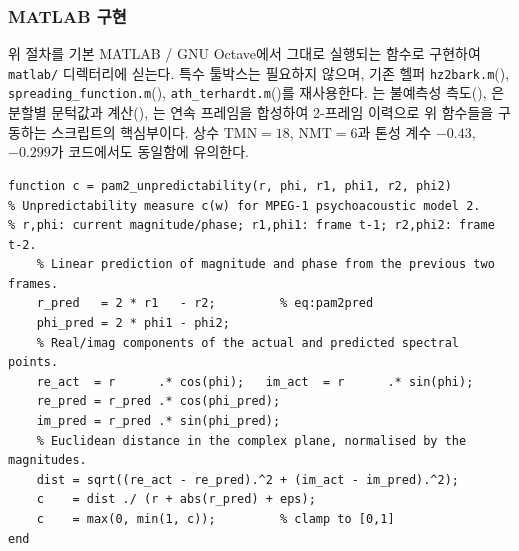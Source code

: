 \documentclass[11pt,a4paper]{article}
\newcommand{\SMR}{\mathrm{SMR}}                        %
\begin{document}
\subsubsection{MATLAB 구현}
위 절차를 기본 MATLAB / GNU Octave에서 그대로 실행되는 함수로 구현하여
\texttt{matlab/} 디렉터리에 싣는다. 특수 툴박스는 필요하지 않으며, 기존 헬퍼
\texttt{hz2bark.m}(), \texttt{spreading\_function.m}(),
\texttt{ath\_terhardt.m}()를 재사용한다. 는 불예측성
측도(), 은 분할별 문턱값과 \SMR{}
계산(),
는 연속 프레임을 합성하여 2-프레임 이력으로 위 함수들을 구동하는
스크립트의 핵심부이다. 상수 $\mathrm{TMN}=18$, $\mathrm{NMT}=6$과 톤성 계수 $-0.43$,
$-0.299$가 코드에서도 동일함에 유의한다.

\begin{lstlisting}[style=matlabstyle,caption={pam2\_unpredictability.m --- unpredictability measure c(w) (eq:pam2unpred)},label={lst:pam2unpred}]
function c = pam2_unpredictability(r, phi, r1, phi1, r2, phi2)
% Unpredictability measure c(w) for MPEG-1 psychoacoustic model 2.
% r,phi: current magnitude/phase; r1,phi1: frame t-1; r2,phi2: frame t-2.
    % Linear prediction of magnitude and phase from the previous two frames.
    r_pred   = 2 * r1   - r2;         % eq:pam2pred
    phi_pred = 2 * phi1 - phi2;
    % Real/imag components of the actual and predicted spectral points.
    re_act  = r      .* cos(phi);   im_act  = r      .* sin(phi);
    re_pred = r_pred .* cos(phi_pred);
    im_pred = r_pred .* sin(phi_pred);
    % Euclidean distance in the complex plane, normalised by the magnitudes.
    dist = sqrt((re_act - re_pred).^2 + (im_act - im_pred).^2);
    c    = dist ./ (r + abs(r_pred) + eps);
    c    = max(0, min(1, c));         % clamp to [0,1]
end
\end{lstlisting}
\end{document}
